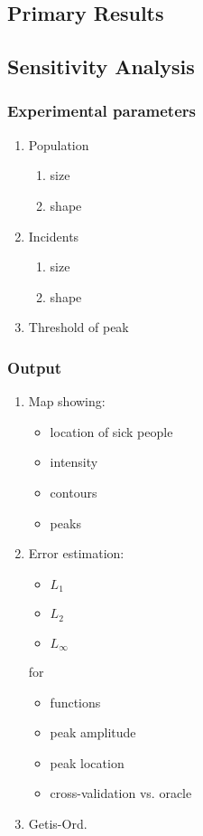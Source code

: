 
\begin{singlespace*}

\section{Primary Results}

\subsection{Sensitivity Analysis}

\subsubsection{Experimental parameters}

\begin{enumerate}
\item Population
    \begin{enumerate}
    \item size
    \item shape
    \end{enumerate}
\item Incidents
    \begin{enumerate}
    \item size
    \item shape
    \end{enumerate}
\item Threshold of peak
\end{enumerate}

\subsubsection{Output}

\begin{enumerate}
\item Map showing:
    \begin{itemize}
    \item location of sick people
    \item intensity
    \item contours
    \item peaks
    \end{itemize}
\item Error estimation:
    \begin{itemize}
    \item $L_1$
    \item $L_2$
    \item $L_\infty$
    \end{itemize}
    for
    \begin{itemize}
    \item functions
    \item peak amplitude
    \item peak location
    \item cross-validation vs. oracle
    \end{itemize}
\item Getis-Ord.


\end{enumerate}
\end{singlespace*}
